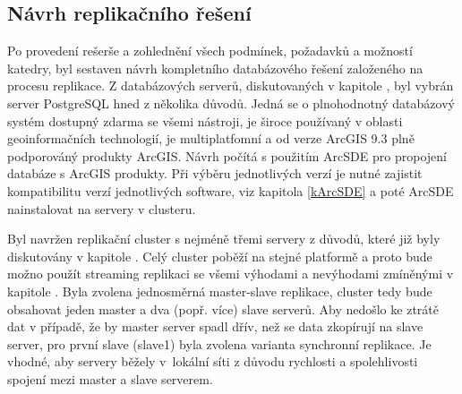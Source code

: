 \subsection[Návrh replikačního řešení]{Návrh replikačního řešení}
      \label{kNavrh}

      Po provedení rešerše a zohlednění všech podmínek, požadavků a možností katedry, byl sestaven návrh kompletního databázového řešení založeného na procesu replikace. Z databázových serverů, diskutovaných v kapitole , byl vybrán server PostgreSQL hned z několika důvodů. Jedná se o plnohodnotný databázový systém dostupný zdarma se všemi nástroji, je široce používaný v oblasti geoinformačních technologií, je multiplatfomní a od verze ArcGIS 9.3 plně podporováný produkty ArcGIS. Návrh počítá s použitím ArcSDE pro propojení databáze s ArcGIS produkty. Při výběru jednotlivých verzí je nutné zajistit kompatibilitu verzí jednotlivých software, viz kapitola \ref{kArcSDE} a poté ArcSDE nainstalovat na servery v clusteru.

Byl navržen replikační cluster s nejméně třemi servery z důvodů, které již byly diskutovány v kapitole . Celý cluster poběží na stejné platformě a proto bude možno použít streaming replikaci se všemi výhodami a nevýhodami zmíněnými v kapitole . Byla zvolena jednosměrná master-slave replikace, cluster tedy bude obsahovat jeden master a dva (popř. více) slave serverů. Aby nedošlo ke ztrátě dat v případě, že by master server spadl dřív, než se data zkopírují na slave server, pro první slave (slave1) byla zvolena varianta synchronní replikace. Je vhodné, aby servery běžely v~lokální síti z důvodu rychlosti a spolehlivosti spojení mezi master a slave serverem. 

